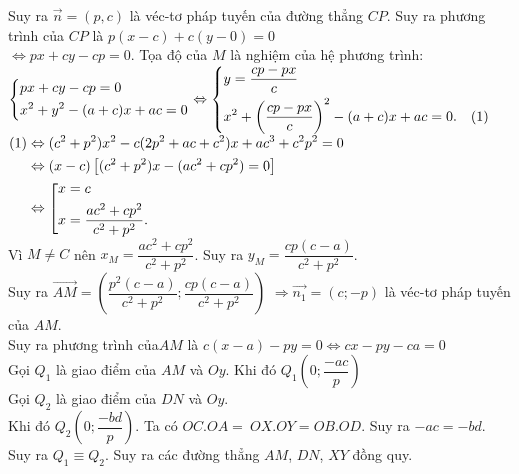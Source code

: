 \begin{bt}[IMO 1995]
{{}
		
		Suy ra $\overrightarrow{n}=(p,c)$ là véc-tơ pháp tuyến của đường thẳng $CP$. Suy ra phương trình của $CP$ là $p(x-c)+c(y-0)=0$ \\
		$ \Leftrightarrow px+cy-cp=0$. Tọa độ của $M$ là nghiệm của hệ phương trình:\\
		$ \left\{\begin{aligned}&px+cy-cp=0\\
			&x^2+y^2-(a+c)x+ac=0\end{aligned}\right. \Leftrightarrow \left\{\begin{aligned}&y=\dfrac{cp-px}{c}\\
			&x^2+\left(\dfrac{cp-px}{c}\right)^2-(a+c)x+ac=0. \quad (1)\end{aligned}\right.$\\
		$\begin{aligned}
		(1) &\Leftrightarrow (c^2+p^2)x^2-c(2p^2+ac+c^2)x+ac^3+c^2p^2=0\\
		&\Leftrightarrow (x-c)\left[(c^2+p^2)x-(ac^2+cp^2)=0\right] \\
		&\Leftrightarrow \left[\begin{aligned}&x=c\\
			&x=\dfrac{ac^2+cp^2}{c^2+p^2}.\end{aligned}\right.
		\end{aligned}$\\
		Vì $M\ne C$ nên $x_M=\dfrac{ac^2+cp^2}{c^2+p^2}$. Suy ra $y_M=\dfrac{cp(c-a)}{c^2+p^2}$.\\
		Suy ra $\overrightarrow{AM}=\left(\dfrac{p^2(c-a)}{c^2+p^2};\dfrac{cp(c-a)}{c^2+p^2}\right)$ $ \Rightarrow \overrightarrow{n_1}=(c;-p)$ là véc-tơ pháp tuyến của $AM$.\\
		Suy ra phương trình của$AM$ là $c(x-a)-py=0 \Leftrightarrow cx-py-ca=0$ \\
		Gọi $Q_1$ là giao điểm của $AM$ và $Oy$. Khi đó $Q_1(0;\dfrac{-ac}{p})$ \\
		Gọi $Q_2$ là giao điểm của $DN$ và $Oy$.\\
		Khi đó $Q_2(0;\dfrac{-bd}{p})$. Ta có $OC.OA= ~ OX.OY=OB.OD$. Suy ra $-ac=-bd$.\\
		Suy ra $Q_1\equiv Q_2$. Suy ra các đường thẳng $AM$, $ DN $, $XY$ đồng quy.	
	}
\end{bt}
